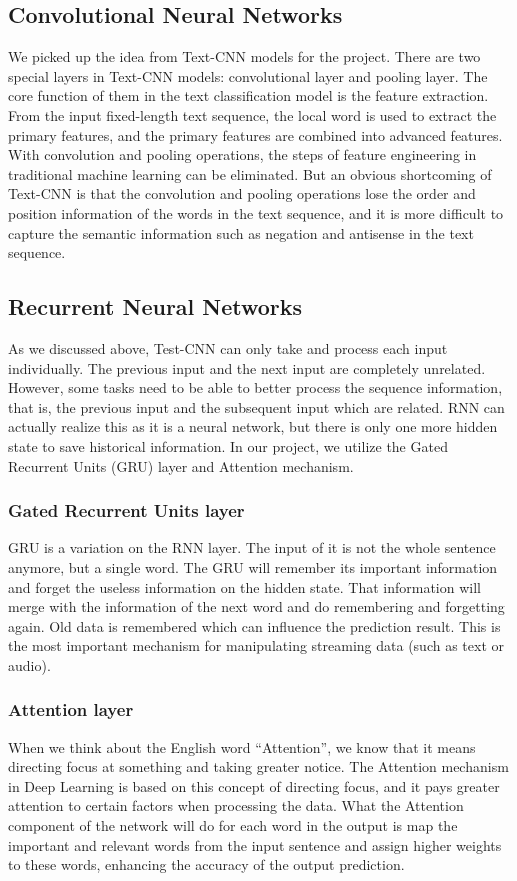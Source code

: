 \documentclass[runningheads]{llncs}
\begin{document}
\subsection{Convolutional Neural Networks}
We picked up the idea from Text-CNN \cite{ref_yoon} models for the project. There are two special layers in Text-CNN models: convolutional layer and pooling layer. The core function of them in the text classification model is the feature extraction. From the input fixed-length text sequence, the local word is used to extract the primary features, and the primary features are combined into advanced features. With convolution and pooling operations, the steps of feature engineering in traditional machine learning can be eliminated. But an obvious shortcoming of Text-CNN is that the convolution and pooling operations lose the order and position information of the words in the text sequence, and it is more difficult to capture the semantic information such as negation and antisense in the text sequence.

\subsection{Recurrent Neural Networks}
As we discussed above, Test-CNN can only take and process each input individually. The previous input and the next input are completely unrelated. However, some tasks need to be able to better process the sequence information, that is, the previous input and the subsequent input which are related. RNN can actually realize this as it is a neural network, but there is only one more hidden state to save historical information. In our project, we utilize the Gated Recurrent Units (GRU) layer and Attention mechanism.

\subsubsection{Gated Recurrent Units layer}
GRU is a variation on the RNN layer. The input of it is not the whole sentence anymore, but a single word. The GRU will remember its important information and forget the useless information on the hidden state. That information will merge with the information of the next word and do remembering and forgetting again. Old data is remembered which can influence the prediction result. This is the most important mechanism for manipulating streaming data (such as text or audio).

\subsubsection{Attention layer}
When we think about the English word ``Attention'', we know that it means directing focus at something and taking greater notice. The Attention mechanism in Deep Learning is based on this concept of directing focus, and it pays greater attention to certain factors when processing the data. What the Attention component of the network will do for each word in the output is map the important and relevant words from the input sentence and assign higher weights to these words, enhancing the accuracy of the output prediction.
\end{document}
